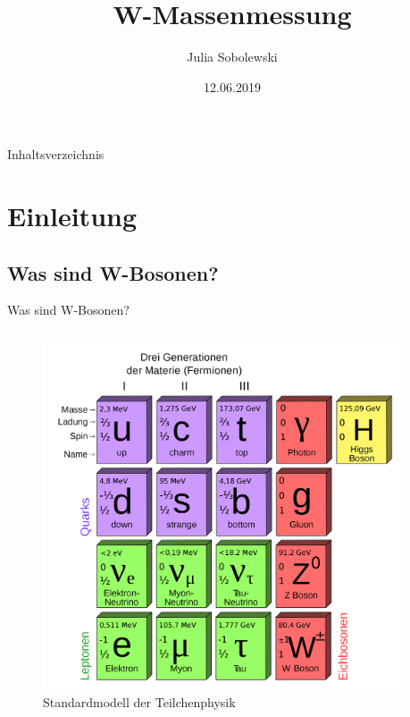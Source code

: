 \documentclass[aspectratio=1610, 9pt]{beamer}
\title{W-Massenmessung}
\author[Julia ~Sobolewski]{Julia Sobolewski}
\institute[Fakultät Physik]{Fakultät Physik}
\date{12.06.2019}
\begin{document}
\maketitle

\begin{frame}{Inhaltsverzeichnis}
  \tableofcontents
\end{frame}

\section{Einleitung}

\subsection{Was sind W-Bosonen?}

\begin{frame}{Was sind W-Bosonen?}
  \begin{columns}
    \begin{column}{0.4\textwidth}
      \begin{figure}
        \includegraphics[width=\textwidth]{images/standard_model.png}
        \caption{Standardmodell der Teilchenphysik \cite{standard_model}}
      \end{figure}
    \end{column}
    \begin{column}{0.4\textwidth}

\end{column}
\end{columns}
\end{frame}
\end{document}
